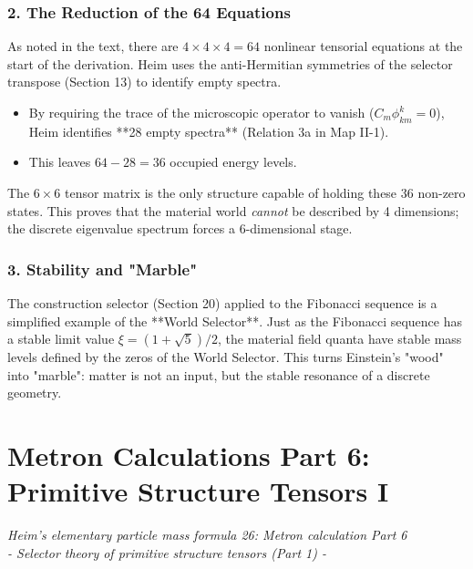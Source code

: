 \documentclass[11pt,a4paper,oneside]{article}
\begin{document}
\subsubsection*{2. The Reduction of the 64 Equations}
As noted in the text, there are $4 \times 4 \times 4 = 64$ nonlinear tensorial equations at the start of the derivation. Heim uses the anti-Hermitian symmetries of the selector transpose (Section 13) to identify empty spectra.
\begin{itemize}
    \item By requiring the trace of the microscopic operator to vanish ($C_m \phi^k_{km} = 0$), Heim identifies **28 empty spectra** (Relation 3a in Map II-1).
    \item This leaves $64 - 28 = 36$ occupied energy levels. 
\end{itemize}
The $6 \times 6$ tensor matrix is the only structure capable of holding these 36 non-zero states. This proves that the material world \textit{cannot} be described by 4 dimensions; the discrete eigenvalue spectrum forces a 6-dimensional stage.

\subsubsection*{3. Stability and "Marble"}
The construction selector (Section 20) applied to the Fibonacci sequence is a simplified example of the **World Selector**. Just as the Fibonacci sequence has a stable limit value $\xi = (1+\sqrt{5})/2$, the material field quanta have stable mass levels defined by the zeros of the World Selector. This turns Einstein's "wood" into "marble": matter is not an input, but the stable resonance of a discrete geometry.
\section{Metron Calculations Part 6: Primitive Structure Tensors I}
\textit{Heim's elementary particle mass formula 26: Metron calculation Part 6 \\ - Selector theory of primitive structure tensors (Part 1) -}
\end{document}
